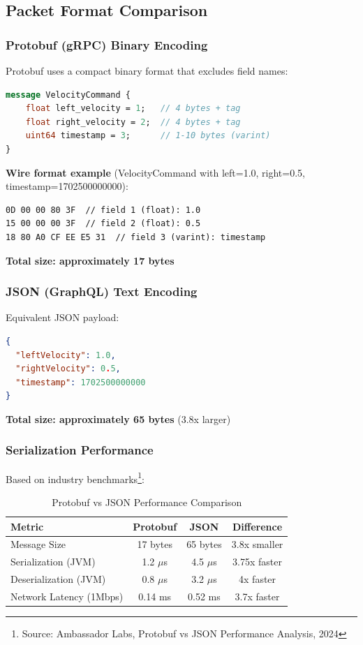 \documentclass[11pt,letterpaper]{article}
\begin{document}
\subsection{Packet Format Comparison}

\subsubsection{Protobuf (gRPC) Binary Encoding}

Protobuf uses a compact binary format that excludes field names:

\begin{lstlisting}[language=Protobuf, caption=Protobuf Message Definition]
message VelocityCommand {
    float left_velocity = 1;   // 4 bytes + tag
    float right_velocity = 2;  // 4 bytes + tag
    uint64 timestamp = 3;      // 1-10 bytes (varint)
}
\end{lstlisting}

\textbf{Wire format example} (VelocityCommand with left=1.0, right=0.5, timestamp=1702500000000):
\begin{verbatim}
0D 00 00 80 3F  // field 1 (float): 1.0
15 00 00 00 3F  // field 2 (float): 0.5
18 80 A0 CF EE E5 31  // field 3 (varint): timestamp
\end{verbatim}

\textbf{Total size: approximately 17 bytes}

\subsubsection{JSON (GraphQL) Text Encoding}

Equivalent JSON payload:
\begin{lstlisting}[language=json, caption=JSON Equivalent]
{
  "leftVelocity": 1.0,
  "rightVelocity": 0.5,
  "timestamp": 1702500000000
}
\end{lstlisting}

\textbf{Total size: approximately 65 bytes} (3.8x larger)

\subsubsection{Serialization Performance}

Based on industry benchmarks\footnote{Source: Ambassador Labs, Protobuf vs JSON Performance Analysis, 2024}:

\begin{table}[H]
\centering
\begin{tabular}{|l|c|c|c|}
\hline
\textbf{Metric} & \textbf{Protobuf} & \textbf{JSON} & \textbf{Difference} \\
\hline
Message Size & 17 bytes & 65 bytes & 3.8x smaller \\
Serialization (JVM) & 1.2 $\mu$s & 4.5 $\mu$s & 3.75x faster \\
Deserialization (JVM) & 0.8 $\mu$s & 3.2 $\mu$s & 4x faster \\
Network Latency (1Mbps) & 0.14 ms & 0.52 ms & 3.7x faster \\
\hline
\end{tabular}
\caption{Protobuf vs JSON Performance Comparison}
\end{table}
\end{document}
